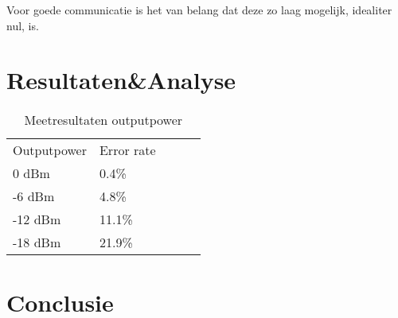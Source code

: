 \documentclass[a4paper,10pt]{article}
\begin{document}
Voor goede communicatie is het van belang dat deze zo laag mogelijk, idealiter nul, is.

\section{Resultaten\&Analyse}

\begin{table}[h]
	\caption{Meetresultaten outputpower}
	\begin{tabular}{lllll}
	Outputpower &  Error rate  	\\
	0 dBm       &  0.4\% 		\\
	-6 dBm      &  4.8\% 		\\
	-12 dBm     &  11.1\% 		\\
	-18 dBm     &  21.9\%
	\end{tabular}
\end{table}

\section{Conclusie}
\end{document}
